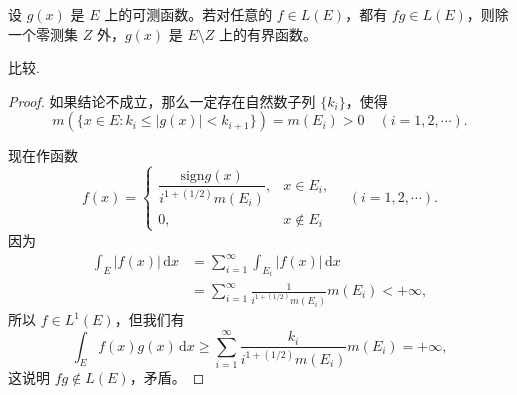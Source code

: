 \documentclass[../../main.tex]{subfiles}
\begin{document}
\begin{proposition}
设 $g(x)$ 是 $E$ 上的可测函数。若对任意的 $f \in L(E)$，都有 $fg \in L(E)$，则除一个零测集 $Z$ 外，$g(x)$ 是 $E \setminus Z$ 上的有界函数。
\end{proposition}
\begin{remark}
比较.
\end{remark}
\begin{proof}
如果结论不成立，那么一定存在自然数子列 $\{ k_i \}$，使得
\[
m(\{ x \in E : k_i \leqslant |g(x)| < k_{i+1} \}) = m(E_i) > 0 \quad (i = 1, 2, \cdots).
\]

现在作函数
\[
f(x) = 
\begin{cases} 
\dfrac{\text{sign}g(x)}{i^{1 + (1/2)} m(E_i)}, & x \in E_i, \\
0, & x \notin E_i 
\end{cases} \quad (i = 1, 2, \cdots).
\]
因为
\begin{align*}
\int_E |f(x)| \, \mathrm{d}x &= \sum_{i=1}^{\infty} \int_{E_i} |f(x)| \, \mathrm{d}x \\
&= \sum_{i=1}^{\infty} \frac{1}{i^{1 + (1/2)} m(E_i)} m(E_i) < +\infty,
\end{align*}
所以 $f \in L^1(E)$，但我们有
\[
\int_E f(x)g(x) \, \mathrm{d}x \geqslant \sum_{i=1}^{\infty} \frac{k_i}{i^{1 + (1/2)} m(E_i)} m(E_i) = +\infty,
\]
这说明 $fg \notin L(E)$，矛盾。
\end{proof}
\end{document}
